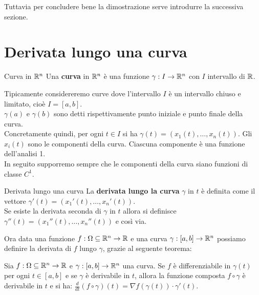 Tuttavia per concludere bene la dimostrazione serve introdurre la successiva sezione.

\section{Derivata lungo una curva}\label{sec:derivata-lungo-una-curva}

\begin{definizione}{Curva in $\mathbb{R}^n$}
Una \textbf{curva} in $\mathbb{R}^n$ è una funzione $\gamma: I \rightarrow \mathbb{R}^n$ con $I$ intervallo di $\mathbb{R}$.
\end{definizione}

Tipicamente considereremo curve dove l'intervallo $I$ è un intervallo chiuso e limitato, cioè $I=[a,b]$.\\
$\gamma(a)$ e $\gamma(b)$ sono detti rispettivamente punto iniziale e punto finale della curva.\\
Concretamente quindi, per ogni $t\in I$ si ha $\gamma(t)=(x_1(t), \dots, x_n(t))$. Gli $x_i(t)$ sono le componenti della curva. Ciascuna componente è una funzione dell'analisi 1.\\
In seguito supporremo sempre che le componenti della curva siano funzioni di classe $C^1$.

\begin{definizione}{Derivata lungo una curva}
  La \textbf{derivata lungo la curva} $\gamma$ in $t$ è definita come il vettore $\gamma'(t)=(x_1'(t), \dots, x_n'(t))$.\\
  Se esiste la derivata seconda di $\gamma$ in $t$ allora si definisce $\gamma''(t)=(x_1''(t), \dots, x_n''(t))$ e così via.
\end{definizione}
Ora data una funzione $f:\Omega \subseteq \mathbb{R}^n \rightarrow \mathbb{R}$ e una curva $\gamma: [a,b] \rightarrow \mathbb{R}^n$ possiamo definire la derivata di $f$ lungo $\gamma$, grazie al seguente teorema:

\begin{teorema}{}
  Sia $f:\Omega \subseteq \mathbb{R}^n \rightarrow \mathbb{R}$ e $\gamma: [a,b] \rightarrow \mathbb{R}^n$ una curva. Se $f$ è differenziabile in $\gamma(t)$ per ogni $t \in [a,b]$ e se $\gamma$ è derivabile in $t$, allora la funzione composta $f \circ \gamma$ è derivabile in $t$ e si ha:
  $\frac{d}{dt}(f \circ \gamma)(t) = \nabla f(\gamma(t)) \cdot \gamma'(t)$.
\end{teorema}

